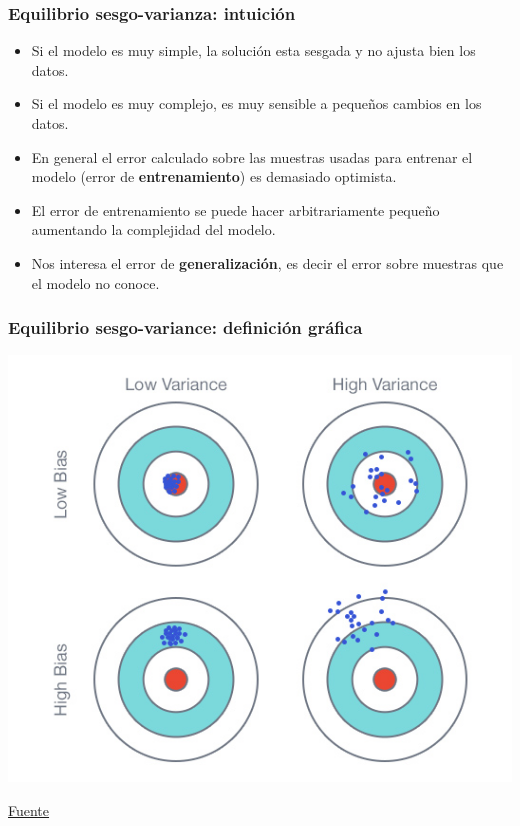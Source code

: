\documentclass{beamer}
\begin{document}
\begin{frame}
\frametitle{Equilibrio sesgo-varianza: intuición}
\begin{itemize}
\item Si el modelo es muy simple, la solución esta sesgada y no ajusta bien los datos.
\item Si el modelo es muy complejo, es muy sensible a pequeños cambios en los datos.

\item En general el error calculado sobre las muestras usadas para entrenar el modelo (error de \textbf{entrenamiento}) es demasiado optimista.

\item El error de entrenamiento se puede hacer arbitrariamente pequeño aumentando la complejidad del modelo.

\item Nos interesa el error de \textbf{generalización}, es decir el error sobre muestras que el modelo no conoce.
\end{itemize}

\end{frame}

\begin{frame}
\frametitle{Equilibrio sesgo-variance: definición gráfica}
\centering
\includegraphics[height=0.80\textheight]{bias_variance_dardos.jpg}

{\footnotesize \href{http://blog.fliptop.com/blog/2015/03/02/bias-variance-and-overfitting-machine-learning-overview/}{Fuente}}
\end{frame}
\end{document}
